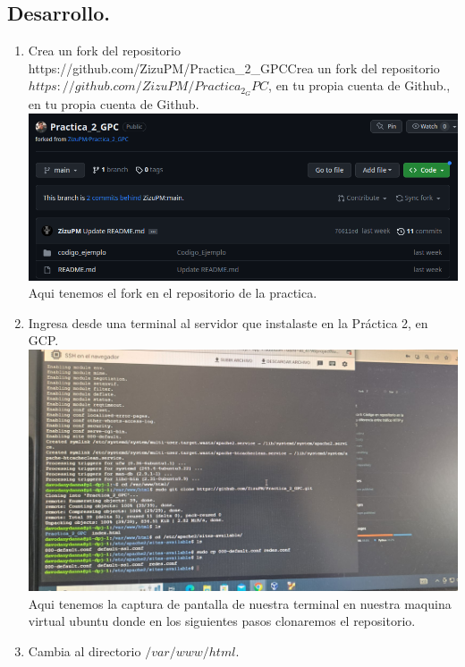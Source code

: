 \documentclass[12pt]{article}
\begin{document}
{\color{blue} \subsection*{\textbf{Desarrollo.}}}
\vspace{1em}
\begin{enumerate}
    \item Crea un fork del repositorio https://github.com/ZizuPM/Practica_2_GPCCrea un fork del repositorio $https://github.com/ZizuPM/Practica_2_GPC$, en tu propia cuenta de Github., en tu propia cuenta de Github.\\
    \textbf{\includegraphics[scale = 0.40]{images/fock en git.png}}\\ Aqui tenemos el fork en el repositorio de la practica.
    \item Ingresa desde una terminal al servidor que instalaste en la Práctica 2, en GCP.\\
    \textbf{\includegraphics[scale = 0.35]{images/pasooooo.jpeg}}\\ Aqui tenemos la captura de pantalla de nuestra terminal en nuestra maquina virtual ubuntu donde en los siguientes pasos clonaremos el repositorio.\\
    \item Cambia al directorio $/var/www/html$.\\

\end{enumerate}
\end{document}

